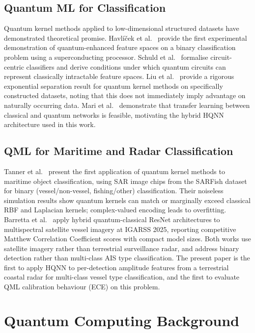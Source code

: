 \documentclass[journal]{IEEEtran}
\begin{document}
\subsection{Quantum ML for Classification}

Quantum kernel methods applied to low-dimensional structured datasets have demonstrated theoretical promise. Havl{\'i}{\v{c}}ek et al.~\cite{havlicek2019supervised} provide the first experimental demonstration of quantum-enhanced feature spaces on a binary classification problem using a superconducting processor. Schuld et al.~\cite{schuld2020circuit} formalise circuit-centric classifiers and derive conditions under which quantum circuits can represent classically intractable feature spaces. Liu et al.~\cite{liu2021rigorous} provide a rigorous exponential separation result for quantum kernel methods on specifically constructed datasets, noting that this does not immediately imply advantage on naturally occurring data. Mari et al.~\cite{mari2020transfer} demonstrate that transfer learning between classical and quantum networks is feasible, motivating the hybrid HQNN architecture used in this work.

\subsection{QML for Maritime and Radar Classification}

Tanner et al.~\cite{tanner2025qkm} present the first application of quantum kernel methods to maritime object classification, using SAR image chips from the SARFish dataset for binary (vessel/non-vessel, fishing/other) classification. Their noiseless simulation results show quantum kernels can match or marginally exceed classical RBF and Laplacian kernels; complex-valued encoding leads to overfitting. Barretta et al.~\cite{barretta2025hqnn} apply hybrid quantum-classical ResNet architectures to multispectral satellite vessel imagery at IGARSS 2025, reporting competitive Matthew Correlation Coefficient scores with compact model sizes. Both works use satellite imagery rather than terrestrial surveillance radar, and address binary detection rather than multi-class AIS type classification. The present paper is the first to apply HQNN to per-detection amplitude features from a terrestrial coastal radar for multi-class vessel type classification, and the first to evaluate QML calibration behaviour (ECE) on this problem.

\section{Quantum Computing Background}
\label{sec:background}
\end{document}
